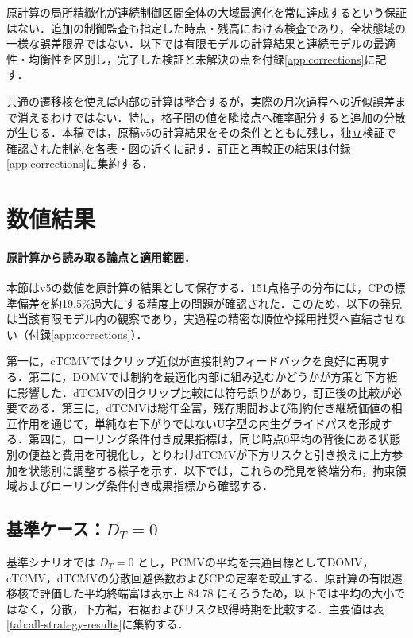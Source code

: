 \documentclass[10pt,a4paper]{article}
\theoremstyle{plain}
\theoremstyle{definition}
\begin{document}
原計算の局所精緻化が連続制御区間全体の大域最適化を常に達成するという保証はない．追加の制御監査も指定した時点・残高における検査であり，全状態域の一様な誤差限界ではない．以下では有限モデルの計算結果と連続モデルの最適性・均衡性を区別し，完了した検証と未解決の点を付録\ref{app:corrections}に記す．

共通の遷移核を使えば内部の計算は整合するが，実際の月次過程への近似誤差まで消えるわけではない．特に，格子間の値を隣接点へ確率配分すると追加の分散が生じる．本稿では，原稿v5の計算結果をその条件とともに残し，独立検証で確認された制約を各表・図の近くに記す．訂正と再較正の結果は付録\ref{app:corrections}に集約する．
\section{数値結果}\label{sec:numerical-results}
\label{sec:all-strategy-numerics}

\paragraph{原計算から読み取る論点と適用範囲．}
本節はv5の数値を原計算の結果として保存する．151点格子の分布には，CPの標準偏差を約19.5\%過大にする精度上の問題が確認された．このため，以下の発見は当該有限モデル内の観察であり，実過程の精密な順位や採用推奨へ直結させない（付録\ref{app:corrections}）．

第一に，cTCMVではクリップ近似が直接制約フィードバックを良好に再現する．第二に，DOMVでは制約を最適化内部に組み込むかどうかが方策と下方裾に影響した．dTCMVの旧クリップ比較には符号誤りがあり，訂正後の比較が必要である．第三に，dTCMVは総年金富，残存期間および制約付き継続価値の相互作用を通じて，単純な右下がりではないU字型の内生グライドパスを形成する．第四に，ローリング条件付き成果指標は，同じ時点0平均の背後にある状態別の便益と費用を可視化し，とりわけdTCMVが下方リスクと引き換えに上方参加を状態別に調整する様子を示す．以下では，これらの発見を終端分布，拘束領域およびローリング条件付き成果指標から確認する．

\subsection{基準ケース：\texorpdfstring{$D_T=0$}{DT=0}}

基準シナリオでは $D_T=0$ とし，PCMVの平均を共通目標としてDOMV，cTCMV，dTCMVの分散回避係数およびCPの定率を較正する．原計算の有限遷移核で評価した平均終端富は表示上 $84.78$ にそろうため，以下では平均の大小ではなく，分散，下方裾，右裾およびリスク取得時期を比較する．主要値は表\ref{tab:all-strategy-results}に集約する．
\end{document}
